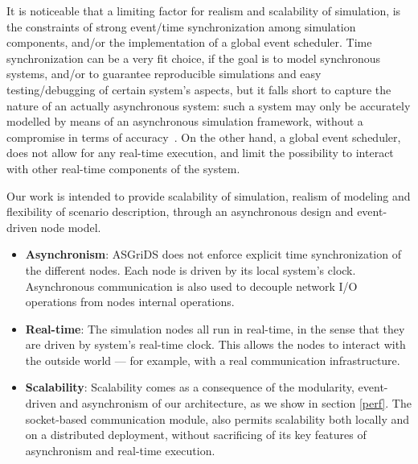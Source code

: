 \documentclass[conference]{IEEEtran}
\begin{document}
It is noticeable that a limiting factor for realism and scalability of simulation, is the constraints of strong event/time synchronization among simulation components, and/or the implementation of a global event scheduler. Time synchronization can be a very fit choice, if the goal is to model synchronous systems, and/or to guarantee reproducible simulations and easy testing/debugging of certain system's aspects, but it falls short to capture the nature of an actually asynchronous system: such a system may only be accurately modelled by means of an asynchronous simulation framework, without a compromise in terms of accuracy~\cite{ghoshRoleModelingAsynchronous2002}. 
On the other hand, a global event scheduler, does not allow for any real-time execution, and limit the possibility to interact with other real-time components of the system.

Our work is intended to provide scalability of simulation, realism of modeling and flexibility of scenario description, through an asynchronous design and event-driven node model.
\begin{itemize}
	\item \textbf{Asynchronism}: ASGriDS does not enforce explicit time synchronization of the different nodes. Each node is driven by its local system's clock. %
	Asynchronous communication is also used to decouple network I/O operations from nodes internal operations.
	\item \textbf{Real-time}: The simulation nodes all run in real-time, in the sense that they are driven by system's real-time clock. This allows the nodes to interact with the outside world --- for example, with a real communication infrastructure.
	\item \textbf{Scalability}: Scalability comes as a consequence of the modularity, event-driven and asynchronism of our architecture, as we show in section \ref{perf}.
	The socket-based communication module, also permits scalability both locally and on a distributed deployment, without sacrificing of its key features of asynchronism and real-time execution.
\end{itemize}
\end{document}
